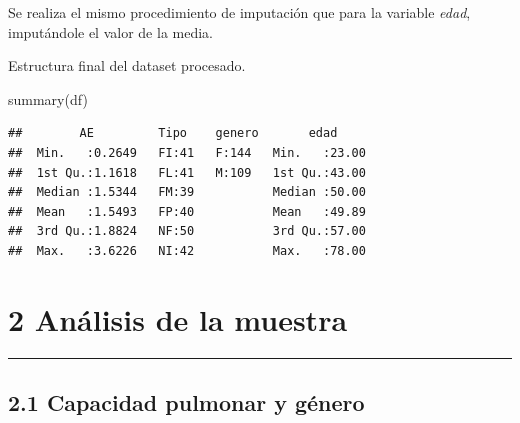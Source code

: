 \documentclass[
]{article}
\newenvironment{Shaded}{\begin{snugshade}}{\end{snugshade}}
\newcommand{\AttributeTok}[1]{\textcolor[rgb]{0.77,0.63,0.00}{#1}}
\newcommand{\FunctionTok}[1]{\textcolor[rgb]{0.00,0.00,0.00}{#1}}
\newcommand{\NormalTok}[1]{#1}
\newcommand{\OtherTok}[1]{\textcolor[rgb]{0.56,0.35,0.01}{#1}}
\newcommand{\SpecialCharTok}[1]{\textcolor[rgb]{0.00,0.00,0.00}{#1}}
\begin{document}
Se realiza el mismo procedimiento de imputación que para la variable
\emph{edad}, imputándole el valor de la media.

\vspace{0.3cm}

\begin{Shaded}
\end{Shaded}

\vspace{0.3cm}

Estructura final del dataset procesado.

\vspace{0.3cm}

\begin{Shaded}
\begin{Highlighting}[]
\FunctionTok{summary}\NormalTok{(df)}
\end{Highlighting}
\end{Shaded}

\begin{verbatim}
##        AE         Tipo    genero       edad      
##  Min.   :0.2649   FI:41   F:144   Min.   :23.00  
##  1st Qu.:1.1618   FL:41   M:109   1st Qu.:43.00  
##  Median :1.5344   FM:39           Median :50.00  
##  Mean   :1.5493   FP:40           Mean   :49.89  
##  3rd Qu.:1.8824   NF:50           3rd Qu.:57.00  
##  Max.   :3.6226   NI:42           Max.   :78.00
\end{verbatim}

\newpage

\hypertarget{anuxe1lisis-de-la-muestra}{%
\section{2 Análisis de la muestra}\label{anuxe1lisis-de-la-muestra}}

\begin{center}\rule{0.5\linewidth}{0.5pt}\end{center}

\hypertarget{capacidad-pulmonar-y-guxe9nero}{%
\subsection{2.1 Capacidad pulmonar y
género}\label{capacidad-pulmonar-y-guxe9nero}}
\end{document}
